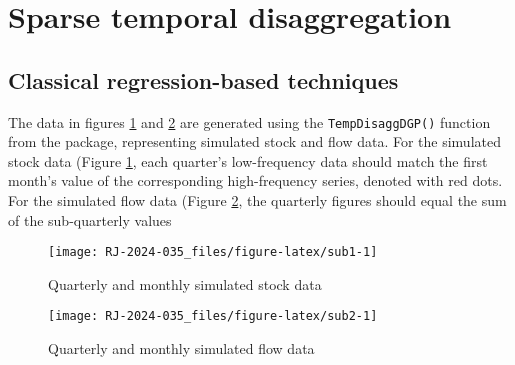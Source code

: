 \hypertarget{Sparse-temporal-disaggregation}{%
\section{Sparse temporal disaggregation}\label{Sparse-temporal-disaggregation}}

\hypertarget{Classical-regression-based-techniques}{%
\subsection{Classical regression-based techniques}\label{Classical-regression-based-techniques}}

The data in figures \ref{fig:sub1} and \ref{fig:sub2} are generated using the \texttt{TempDisaggDGP()} function from the  package, representing simulated stock and flow data. For the simulated stock data (Figure \ref{fig:sub1}, each quarter's low-frequency data should match the first month's value of the corresponding high-frequency series, denoted with red dots. For the simulated flow data (Figure \ref{fig:sub2}, the quarterly figures should equal the sum of the sub-quarterly values

\begin{figure}

{\centering \texttt{[image: RJ-2024-035\_files/figure-latex/sub1-1]} 

}

\caption{Quarterly and monthly simulated stock data}\label{fig:sub1}
\end{figure}

\begin{figure}

{\centering \texttt{[image: RJ-2024-035\_files/figure-latex/sub2-1]} 

}

\caption{Quarterly and monthly simulated flow data}\label{fig:sub2}
\end{figure}

